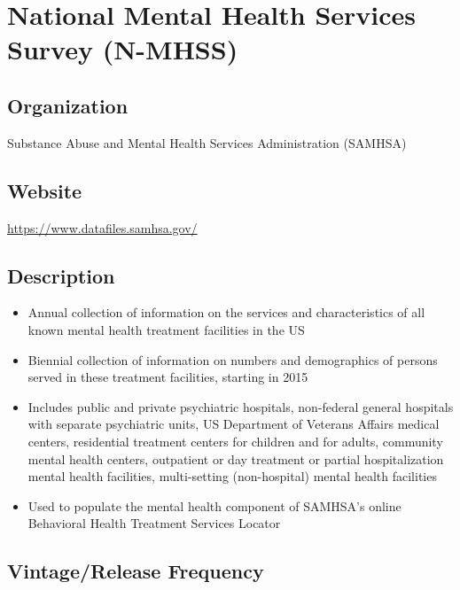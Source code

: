 \documentclass[
]{book}
\providecommand{\tightlist}{%
  \setlength{\itemsep}{0pt}\setlength{\parskip}{0pt}}
\begin{document}
\hypertarget{national-mental-health-services-survey-n-mhss}{%
\chapter{National Mental Health Services Survey (N-MHSS)}\label{national-mental-health-services-survey-n-mhss}}

\hypertarget{organization-60}{%
\section{Organization}\label{organization-60}}

Substance Abuse and Mental Health Services Administration (SAMHSA)

\hypertarget{website-60}{%
\section{Website}\label{website-60}}

\url{https://www.datafiles.samhsa.gov/}

\hypertarget{description-60}{%
\section{Description}\label{description-60}}

\begin{itemize}
\tightlist
\item
  Annual collection of information on the services and characteristics of all known mental health treatment facilities in the US
\item
  Biennial collection of information on numbers and demographics of persons served in these treatment facilities, starting in 2015
\item
  Includes public and private psychiatric hospitals, non-federal general hospitals with separate psychiatric units, US Department of Veterans Affairs medical centers, residential treatment centers for children and for adults, community mental health centers, outpatient or day treatment or partial hospitalization mental health facilities, multi-setting (non-hospital) mental health facilities
\item
  Used to populate the mental health component of SAMHSA's online Behavioral Health Treatment Services Locator
\end{itemize}

\hypertarget{vintagerelease-frequency-60}{%
\section{Vintage/Release Frequency}\label{vintagerelease-frequency-60}}
\end{document}
